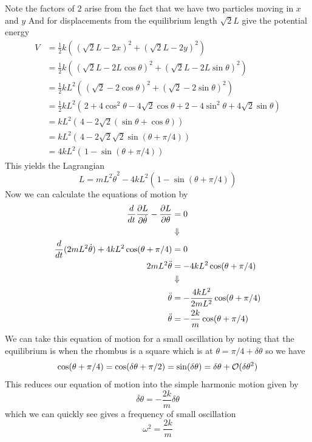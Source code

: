 \documentclass[11pt]{article}
\numberwithin{equation}{section}
\begin{document}
Note the factors of $2$ arise from the fact that we have two particles moving in $x$ and $y$
And for displacements from the equilibrium length $\sqrt{2}L$ give the potential energy
\begin{align*}
V &= \frac{1}{2}k\left(\frac{}{}(\sqrt{2}L-2x)^2+(\sqrt{2}L-2y)^2\right)\\
&= \frac{1}{2}k\left(\frac{}{}(\sqrt{2}L-2L\cos\theta)^2+(\sqrt{2}L-2L\sin\theta)^2\right)\\
&= \frac{1}{2}kL^2\left(\frac{}{}(\sqrt{2}-2\cos\theta)^2+(\sqrt{2}-2\sin\theta)^2\right)\\
&= \frac{1}{2}kL^2\left(\frac{}{}2+4\cos^2\theta-4\sqrt{2}\cos\theta+2-4\sin^2\theta+4\sqrt{2}\sin\theta\right)\\
&= kL^2\left(\frac{}{}4-2\sqrt{2}(\sin\theta+\cos\theta)\right)\\
&= kL^2\left(\frac{}{}4-2\sqrt{2}\sqrt{2}\sin(\theta+\pi/4)\right)\\
&= 4kL^2\left(\frac{}{}1-\sin(\theta+\pi/4)\right)
\end{align*}
This yields the Lagrangian 
$$L = mL^2\dot{\theta}^2 -4kL^2\left(\frac{}{}1-\sin(\theta+\pi/4)\right)$$
Now we can calculate the equations of motion by
\begin{align*}
\frac{d}{dt}\frac{\partial{L}}{\partial{\dot{\theta}}} - \frac{\partial{L}}{\partial{\theta}} &= 0\\
&\Downarrow\\
\frac{d}{dt}(2mL^2\dot{\theta}) + 4kL^2\cos(\theta+\pi/4) &= 0\\
2mL^2\ddot{\theta} &= -4kL^2\cos(\theta+\pi/4)\\
&\Downarrow\\
\ddot{\theta} &= -\frac{4kL^2}{2mL^2}\cos(\theta+\pi/4)\\
\ddot{\theta} &= -\frac{2k}{m}\cos(\theta+\pi/4)
\end{align*}
We can take this equation of motion for a small oscillation by noting that the equilibrium 
is when the rhombus is a square which is at $\theta = \pi/4+\delta\theta$ so we have
$$\cos(\theta+\pi/4) = \cos(\delta\theta+\pi/2) = \sin(\delta\theta) = \delta\theta+\mathcal{O}(\delta\theta^2)$$ 
This reduces our equation of motion into the simple harmonic motion given by
$$\ddot{\delta\theta} = -\frac{2k}{m}\delta\theta$$
which we can quickly see gives a frequency of small oscillation
$$\omega^2 = \frac{2k}{m}$$
\end{document}
